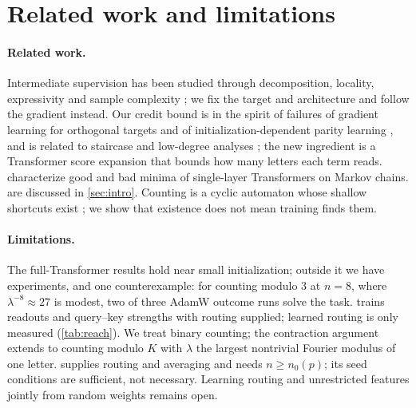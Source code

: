 \section{Related work and limitations}
\label{sec:related}
\label{sec:conclusion}

\paragraph{Related work.} Intermediate supervision has been studied through decomposition, locality,
expressivity and sample complexity
\citep{wies2023subtask,prystawski2023think,abbe2024globality,feng2023towards,merrill2024expressive,malach2023autoregressive,hanneke2026samplecomplexityautoregressivereasoning,wen2024sparse};
we fix the target and architecture and follow the gradient instead. Our credit bound is in the spirit of
failures of gradient learning for orthogonal targets \citep{shalevshwartz2017failures} and of
initialization-dependent parity learning \citep{abbe2025parities}, and is related to staircase and low-degree
analyses \citep{abbe2021staircase,abbe2023sgd,panigrahi2025progressive}; the new ingredient is a Transformer score
expansion that bounds how many letters each term reads. \citet{makkuva2025attention,makkuva2024local}
characterize good and bad minima of single-layer Transformers on Markov chains.  are
discussed in \cref{sec:intro}. Counting is a cyclic automaton whose shallow shortcuts exist
\citep{liu2023automata}; we show that existence does not mean training finds them.

\paragraph{Limitations.} The full-Transformer results hold near small initialization; outside it we have experiments,
and one counterexample: for counting modulo $3$ at $n=8$, where $\lambda^{-8}\approx27$ is modest, two of three AdamW
outcome runs solve the task.  trains readouts and query--key strengths with routing
supplied; learned routing is only measured (\cref{tab:reach}). We treat binary counting; the contraction argument extends
to counting modulo $K$ with $\lambda$ the largest nontrivial Fourier modulus of one letter.  supplies routing and averaging and needs
$n\ge n_0(p)$; its seed conditions are sufficient, not necessary. Learning routing and unrestricted features jointly from
random weights remains open.
